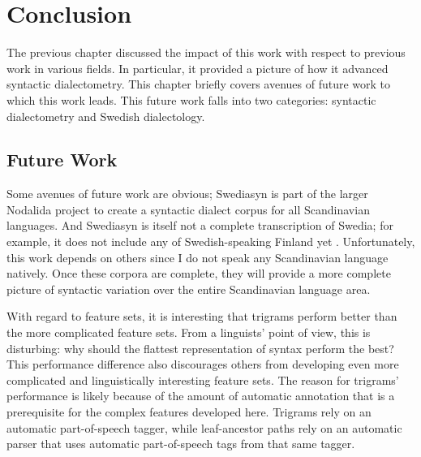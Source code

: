 \chapter{Conclusion}
\label{conclusion-chapter}

The previous chapter discussed the impact of this work with respect to
previous work in various fields. In particular, it provided a picture
of how it advanced syntactic dialectometry. This chapter briefly
covers avenues of future work to which this work leads. This future work falls
into two categories: syntactic dialectometry and Swedish
dialectology.

\section{Future Work}



Some avenues of future work are obvious; Swediasyn is part of the
larger Nodalida project to create a syntactic dialect corpus for all
Scandinavian languages. And Swediasyn is itself not a complete
transcription of Swedia; for example, it does not include any of
Swedish-speaking Finland yet \cite{johennessen09}. Unfortunately, this work depends on
others since I do not speak any Scandinavian language natively. Once
these corpora are complete, they will provide a more complete picture
of syntactic variation over the entire Scandinavian language area.

With regard to feature sets, it is interesting that trigrams perform better
than the more complicated feature sets. From a linguists' point of
view, this is disturbing: why should the flattest representation of
syntax perform the best? This performance difference also
discourages others from developing even more complicated and
linguistically interesting feature sets. The reason for trigrams'
performance is likely because of the amount of automatic annotation
that is a prerequisite for the complex features developed
here. Trigrams rely on an automatic part-of-speech tagger, while
leaf-ancestor paths rely on an automatic parser that uses automatic
part-of-speech tags from that same tagger.

